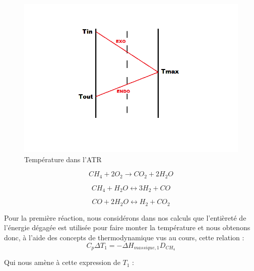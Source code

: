 \documentclass[12pt]{report}
\begin{document}
{\begin{figure}
\vspace{-13mm}
\includegraphics[scale=0.5]{schema_temperature}
\caption{Température dans l'ATR}
\end{figure}
\bigskip
\begin{equation}
CH_4 + 2O_2 \rightarrow CO_2 + 2H_2O
\end{equation}

\bigskip

 \begin{equation}
 CH_4 + H_2O \leftrightarrow 3H_2 + CO
 \end{equation}
 
 \begin{equation}
 CO + 2H_2O \leftrightarrow H_2 + CO_2
 \end{equation}}

\newpage


Pour la première réaction, nous considérons dans nos calculs que l'entièreté de l'énergie dégagée est utilisée pour faire monter la température et nous obtenons donc, à l'aide des concepts de thermodynamique vus au cours, cette relation : \\
$$ C_p\Delta T_1 = -\Delta H_{massique,1}D_{CH_4}$$

Qui nous amène à cette expression de $T_1$ : 
\end{document}
